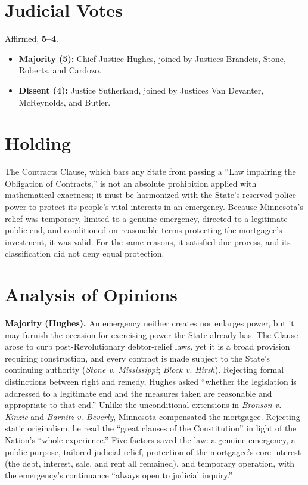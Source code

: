 \documentclass[12pt]{article}
\begin{document}
\section{Judicial Votes}

Affirmed, \textbf{5--4}.
\begin{itemize}
\item \textbf{Majority (5):} Chief Justice Hughes, joined by Justices Brandeis, Stone, Roberts, and Cardozo.
\item \textbf{Dissent (4):} Justice Sutherland, joined by Justices Van Devanter, McReynolds, and Butler.
\end{itemize}

\section{Holding}

The Contracts Clause, which bars any State from passing a ``Law impairing the Obligation of Contracts,'' is not an absolute prohibition applied with mathematical exactness; it must be harmonized with the State's reserved police power to protect its people's vital interests in an emergency. Because Minnesota's relief was temporary, limited to a genuine emergency, directed to a legitimate public end, and conditioned on reasonable terms protecting the mortgagee's investment, it was valid. For the same reasons, it satisfied due process, and its classification did not deny equal protection.

\section{Analysis of Opinions}

\textbf{Majority (Hughes).} An emergency neither creates nor enlarges power, but it may furnish the occasion for exercising power the State already has. The Clause arose to curb post-Revolutionary debtor-relief laws, yet it is a broad provision requiring construction, and every contract is made subject to the State's continuing authority (\textit{Stone v. Mississippi}; \textit{Block v. Hirsh}). Rejecting formal distinctions between right and remedy, Hughes asked ``whether the legislation is addressed to a legitimate end and the measures taken are reasonable and appropriate to that end.'' Unlike the unconditional extensions in \textit{Bronson v. Kinzie} and \textit{Barnitz v. Beverly}, Minnesota compensated the mortgagee. Rejecting static originalism, he read the ``great clauses of the Constitution'' in light of the Nation's ``whole experience.'' Five factors saved the law: a genuine emergency, a public purpose, tailored judicial relief, protection of the mortgagee's core interest (the debt, interest, sale, and rent all remained), and temporary operation, with the emergency's continuance ``always open to judicial inquiry.''
\end{document}

